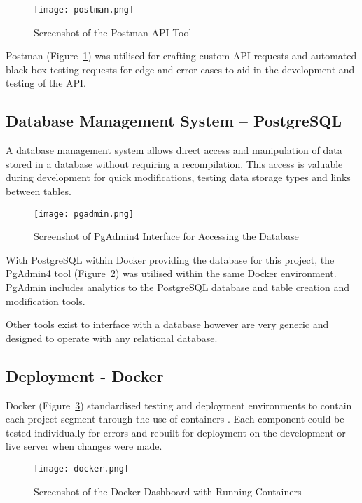 \begin{figure}[ht!]
    \centerline{\texttt{[image: postman.png]}}
    \caption{Screenshot of the Postman API Tool}
    \label{fig:postman}
\end{figure}

Postman (Figure~\ref{fig:postman}) was utilised for crafting custom API requests and automated black box testing requests for edge and error cases to aid in the development and testing of the API.


\subsection{Database Management System -- PostgreSQL}
A database management system allows direct access and manipulation of data stored in a database without requiring a recompilation. This access is valuable during development for quick modifications, testing data storage types and links between tables.

\begin{figure}[ht!]
    \centerline{\texttt{[image: pgadmin.png]}}
    \caption{Screenshot of PgAdmin4 Interface for Accessing the Database}
    \label{fig:pgadmin}
\end{figure}

With PostgreSQL within Docker providing the database for this project, the PgAdmin4 tool (Figure~\ref{fig:pgadmin}) was utilised within the same Docker environment. PgAdmin includes analytics to the PostgreSQL database and table creation and modification tools.

Other tools exist to interface with a database however are very generic and designed to operate with any relational database.


\subsection{Deployment - Docker}
Docker (Figure~\ref{fig:docker}) standardised testing and deployment environments to contain each project segment through the use of containers \parencite{merkel_docker_2014}. Each component could be tested individually for errors and rebuilt for deployment on the development or live server when changes were made.

\begin{figure}[ht!]
    \centerline{\texttt{[image: docker.png]}}
    \caption{Screenshot of the Docker Dashboard with Running Containers}
    \label{fig:docker}
\end{figure}

